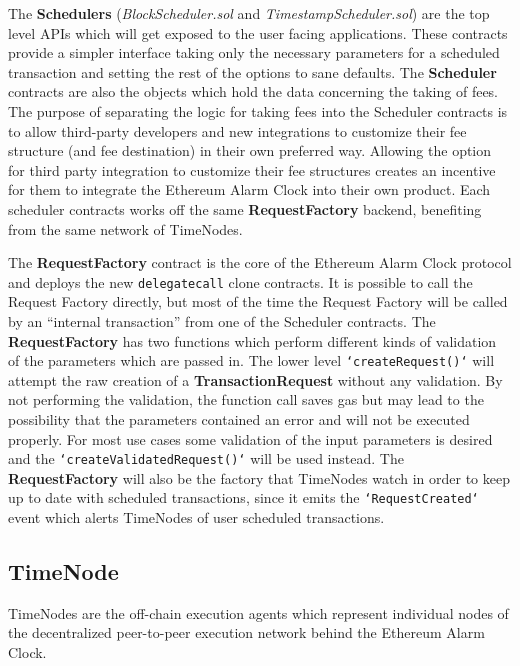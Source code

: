 \documentclass{report}
\begin{document}
  The \textbf{Schedulers} (\textit{BlockScheduler.sol} and \textit{TimestampScheduler.sol}) are the top level APIs which will get exposed to the user facing applications. These contracts provide a simpler interface taking only the necessary parameters for a scheduled transaction and setting the rest of the options to sane defaults. The \textbf{Scheduler} contracts are also the objects which hold the data concerning the taking of fees. The purpose of separating the logic for taking fees into the Scheduler contracts is to allow third-party developers and new integrations to customize their fee structure (and fee destination) in their own preferred way. Allowing the option for third party integration to customize their fee structures creates an incentive for them to integrate the Ethereum Alarm Clock into their own product. Each scheduler contracts works off the same \textbf{RequestFactory} backend, benefiting from the same network of TimeNodes.

  The \textbf{RequestFactory} contract is the core of the Ethereum Alarm Clock protocol and deploys the new \texttt{delegatecall} clone contracts. It is possible to call the Request Factory directly, but most of the time the Request Factory will be called by an “internal transaction” from one of the Scheduler contracts. The \textbf{RequestFactory} has two functions which perform different kinds of validation of the parameters which are passed in. The lower level \texttt{`createRequest()`} will attempt the raw creation of a \textbf{TransactionRequest} without any validation. By not performing the validation, the function call saves gas but may lead to the possibility that the parameters contained an error and will not be executed properly. For most use cases some validation of the input parameters is desired and the \texttt{`createValidatedRequest()`} will be used instead. The \textbf{RequestFactory} will also be the factory that TimeNodes watch in order to keep up to date with scheduled transactions, since it emits the \texttt{`RequestCreated`} event which alerts TimeNodes of user scheduled transactions.

  \subsection{TimeNode}
  TimeNodes are the off-chain execution agents which represent individual nodes of the decentralized peer-to-peer execution network behind the Ethereum Alarm Clock.
\end{document}

